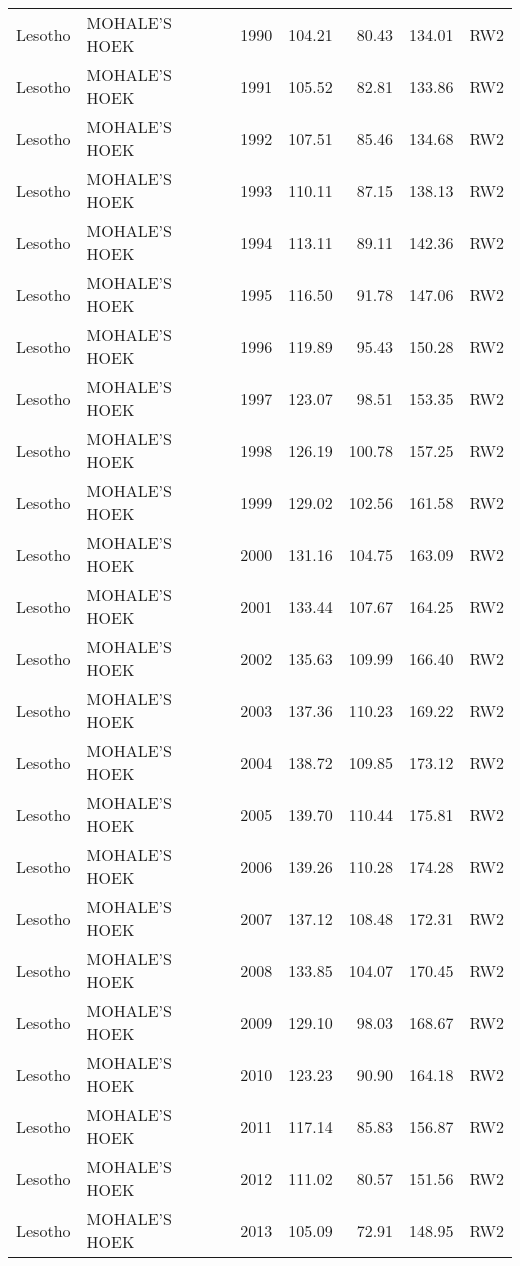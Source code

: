 \begin{longtable}{lllrrrl}
  Lesotho & MOHALE'S HOEK & 1990 & 104.21 & 80.43 & 134.01 & RW2 \\ 
  Lesotho & MOHALE'S HOEK & 1991 & 105.52 & 82.81 & 133.86 & RW2 \\ 
  Lesotho & MOHALE'S HOEK & 1992 & 107.51 & 85.46 & 134.68 & RW2 \\ 
  Lesotho & MOHALE'S HOEK & 1993 & 110.11 & 87.15 & 138.13 & RW2 \\ 
  Lesotho & MOHALE'S HOEK & 1994 & 113.11 & 89.11 & 142.36 & RW2 \\ 
  Lesotho & MOHALE'S HOEK & 1995 & 116.50 & 91.78 & 147.06 & RW2 \\ 
  Lesotho & MOHALE'S HOEK & 1996 & 119.89 & 95.43 & 150.28 & RW2 \\ 
  Lesotho & MOHALE'S HOEK & 1997 & 123.07 & 98.51 & 153.35 & RW2 \\ 
  Lesotho & MOHALE'S HOEK & 1998 & 126.19 & 100.78 & 157.25 & RW2 \\ 
  Lesotho & MOHALE'S HOEK & 1999 & 129.02 & 102.56 & 161.58 & RW2 \\ 
  Lesotho & MOHALE'S HOEK & 2000 & 131.16 & 104.75 & 163.09 & RW2 \\ 
  Lesotho & MOHALE'S HOEK & 2001 & 133.44 & 107.67 & 164.25 & RW2 \\ 
  Lesotho & MOHALE'S HOEK & 2002 & 135.63 & 109.99 & 166.40 & RW2 \\ 
  Lesotho & MOHALE'S HOEK & 2003 & 137.36 & 110.23 & 169.22 & RW2 \\ 
  Lesotho & MOHALE'S HOEK & 2004 & 138.72 & 109.85 & 173.12 & RW2 \\ 
  Lesotho & MOHALE'S HOEK & 2005 & 139.70 & 110.44 & 175.81 & RW2 \\ 
  Lesotho & MOHALE'S HOEK & 2006 & 139.26 & 110.28 & 174.28 & RW2 \\ 
  Lesotho & MOHALE'S HOEK & 2007 & 137.12 & 108.48 & 172.31 & RW2 \\ 
  Lesotho & MOHALE'S HOEK & 2008 & 133.85 & 104.07 & 170.45 & RW2 \\ 
  Lesotho & MOHALE'S HOEK & 2009 & 129.10 & 98.03 & 168.67 & RW2 \\ 
  Lesotho & MOHALE'S HOEK & 2010 & 123.23 & 90.90 & 164.18 & RW2 \\ 
  Lesotho & MOHALE'S HOEK & 2011 & 117.14 & 85.83 & 156.87 & RW2 \\ 
  Lesotho & MOHALE'S HOEK & 2012 & 111.02 & 80.57 & 151.56 & RW2 \\ 
  Lesotho & MOHALE'S HOEK & 2013 & 105.09 & 72.91 & 148.95 & RW2 \\ 

\end{longtable}
